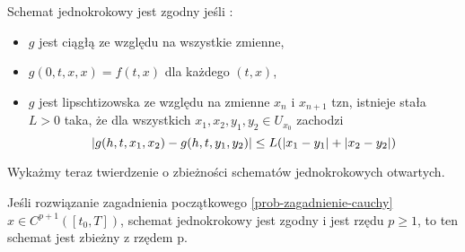 \documentclass[12pt,a4paper]{report}
\begin{document}
\begin{definition}\label{definition-consistency}
Schemat jednokrokowy jest zgodny jeśli :
\begin{itemize}
\item $g$ jest ciągłą ze względu na wszystkie zmienne,
\item $g(0,t,x,x) = f(t,x)$ dla każdego $(t,x)$,
\item $g$ jest lipschtizowska ze względu na zmienne $x_n$ i $x_{n+1}$ tzn, istnieje stała $L>0$ taka, że dla wszystkich $x_1,x_2,y_1,y_2 \in U_{x_0}$ zachodzi
$$
{\left| {g(h,t,x_1,x_2) - g(h,t,y_1,y_2)} \right|} \leq L  ( {\left| {x_1 - y_1} \right|} + {\left| {x_2 - y_2} \right|})
$$
\end{itemize}
\end{definition}
Wykażmy teraz twierdzenie o zbieżności schematów jednokrokowych otwartych. 
\begin{theorem} \label{theorem-convergence-one-step-schema} 
Jeśli rozwiązanie zagadnienia początkowego \ref{prob-zagadnienie-cauchy} $x \in C^{p+1}([t_0,T])$, schemat jednokrokowy jest zgodny i jest rzędu $p\geqslant1$, to ten schemat jest zbieżny z rzędem p. 

\end{theorem}
\end{document}
